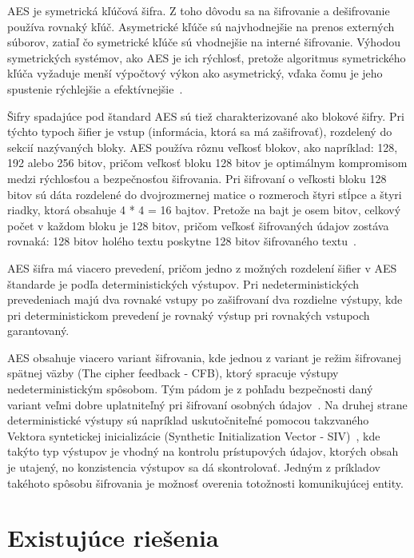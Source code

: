 AES je symetrická kľúčová šifra.
Z toho dôvodu sa na šifrovanie a dešifrovanie používa rovnaký kľúč.
Asymetrické kľúče sú najvhodnejšie na prenos externých súborov, zatiaľ čo symetrické kľúče sú vhodnejšie na interné
šifrovanie.
Výhodou symetrických systémov, ako AES je ich rýchlosť, pretože algoritmus symetrického kľúča vyžaduje menší výpočtový
výkon ako asymetrický, vďaka čomu je jeho spustenie rýchlejšie a efektívnejšie~\cite{UnderstandingAes}.

Šifry spadajúce pod štandard AES sú tiež charakterizované ako blokové šifry.
Pri týchto typoch šifier je vstup (informácia, ktorá sa má zašifrovať), rozdelený do sekcií nazývaných bloky.
AES používa rôznu veľkosť blokov, ako napríklad: 128, 192 alebo 256 bitov, pričom veľkosť bloku 128 bitov je optimálnym
kompromisom medzi rýchlosťou a bezpečnosťou šifrovania.
Pri šifrovaní o veľkosti bloku 128 bitov sú dáta rozdelené do dvojrozmernej matice o rozmeroch štyri stĺpce a štyri riadky,
ktorá obsahuje 4 * 4 = 16 bajtov.
Pretože na bajt je osem bitov, celkový počet v každom bloku je 128 bitov, pričom veľkosť šifrovaných údajov zostáva
rovnaká: 128 bitov holého textu poskytne 128 bitov šifrovaného textu~\cite{rfc3602}.

AES šifra má viacero prevedení, pričom jedno z možných rozdelení šifier v AES štandarde je podľa deterministických výstupov.
Pri nedeterministických prevedeniach majú dva rovnaké vstupy po zašifrovaní dva rozdielne výstupy, kde pri deterministickom
prevedení je rovnaký výstup pri rovnakých vstupoch garantovaný.

AES obsahuje viacero variant šifrovania, kde jednou z variant je režim šifrovanej spätnej väzby (The cipher feedback - CFB),
ktorý spracuje výstupy nedeterministickým spôsobom.
Tým pádom je z pohľadu bezpečnosti daný variant veľmi dobre uplatniteľný pri šifrovaní osobných údajov~\cite{CFB}.
Na druhej strane deterministické výstupy sú napríklad uskutočniteľné pomocou takzvaného Vektora syntetickej inicializácie
(Synthetic Initialization Vector - SIV)~\cite{SIV}, kde takýto typ výstupov je vhodný na kontrolu prístupových údajov, ktorých obsah je
utajený, no konzistencia výstupov sa dá skontrolovať.
Jedným z príkladov takéhoto spôsobu šifrovania je možnosť overenia totožnosti komunikujúcej entity.

\section{Existujúce riešenia}\label{sec:existujuce-riesenia}

